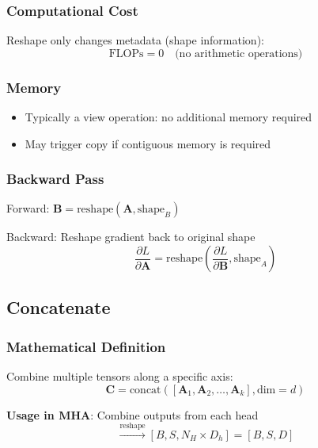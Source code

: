 \documentclass[10pt]{article}
\begin{document}
\subsubsection{Computational Cost}

Reshape only changes metadata (shape information):
\begin{equation}
\text{FLOPs} = 0 \quad \text{(no arithmetic operations)}
\end{equation}

\subsubsection{Memory}

\begin{itemize}
  \item Typically a view operation: no additional memory required
  \item May trigger copy if contiguous memory is required
\end{itemize}

\subsubsection{Backward Pass}

Forward: $\mathbf{B} = \text{reshape}(\mathbf{A}, \text{shape}_B)$

Backward: Reshape gradient back to original shape
\begin{equation}
\frac{\partial L}{\partial \mathbf{A}} = \text{reshape}\left(\frac{\partial L}{\partial \mathbf{B}}, \text{shape}_A\right)
\end{equation}

\subsection{Concatenate}
\label{subsec:concat}

\subsubsection{Mathematical Definition}

Combine multiple tensors along a specific axis:
\begin{equation}
\mathbf{C} = \text{concat}([\mathbf{A}_1, \mathbf{A}_2, \ldots, \mathbf{A}_k], \text{dim}=d)
\end{equation}

\textbf{Usage in MHA}: Combine outputs from each head
\begin{equation}
[B,S,N_H,D_h] \xrightarrow{\text{reshape}} [B,S,N_H \times D_h] = [B,S,D]
\end{equation}
\end{document}

